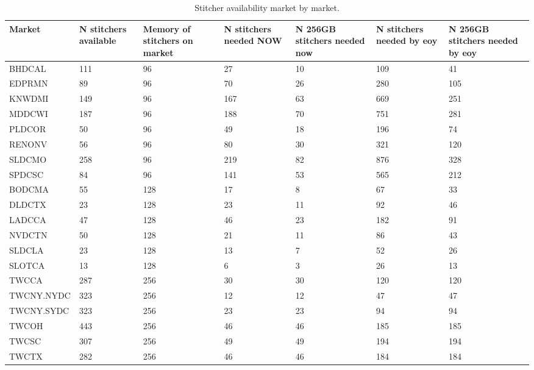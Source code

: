 \documentclass{article}
\begin{document}
\begin{table}
\begin{tabular}{|l|p{17mm}|p{17mm}|p{17mm}|p{17mm}|p{17mm}|p{17mm}|} 
\hline Market & N stitchers available & Memory of stitchers on market & N stitchers needed NOW & N 256GB stitchers needed now & N stitchers needed by eoy & N 256GB stitchers needed by eoy \\
\hline BHDCAL & 111 & 96 & 27 & 10 & 109 & 41 \\
\hline EDPRMN & 89 & 96 & 70 & 26 & 280 & 105 \\
\rowcolor{orange}\hline KNWDMI & 149 & 96 & 167 & 63 & 669 & 251 \\
\rowcolor{orange}\hline MDDCWI & 187 & 96 & 188 & 70 & 751 & 281 \\
\rowcolor{yellow}\hline PLDCOR & 50 & 96 & 49 & 18 & 196 & 74 \\
\rowcolor{orange}\hline RENONV & 56 & 96 & 80 & 30 & 321 & 120 \\
\hline SLDCMO & 258 & 96 & 219 & 82 & 876 & 328 \\
\rowcolor{orange}\hline SPDCSC & 84 & 96 & 141 & 53 & 565 & 212 \\
\hline BODCMA & 55 & 128 & 17 & 8 & 67 & 33 \\
\rowcolor{yellow}\hline DLDCTX & 23 & 128 & 23 & 11 & 92 & 46 \\
\rowcolor{yellow}\hline LADCCA & 47 & 128 & 46 & 23 & 182 & 91 \\
\hline NVDCTN & 50 & 128 & 21 & 11 & 86 & 43 \\
\hline SLDCLA & 23 & 128 & 13 & 7 & 52 & 26 \\
\hline SLOTCA & 13 & 128 & 6 & 3 & 26 & 13 \\
\hline TWCCA & 287 & 256 & 30 & 30 & 120 & 120 \\
\hline TWCNY.NYDC & 323 & 256 & 12 & 12 & 47 & 47 \\
\hline TWCNY.SYDC & 323 & 256 & 23 & 23 & 94 & 94 \\
\hline TWCOH & 443 & 256 & 46 & 46 & 185 & 185 \\
\hline TWCSC & 307 & 256 & 49 & 49 & 194 & 194 \\
\hline TWCTX & 282 & 256 & 46 & 46 & 184 & 184 \\
\hline 
\end{tabular}
\caption{\label{TABLE-StitchersNeeded}Stitcher availability market by market.} 
\end{table}



\newpage
\end{document}
